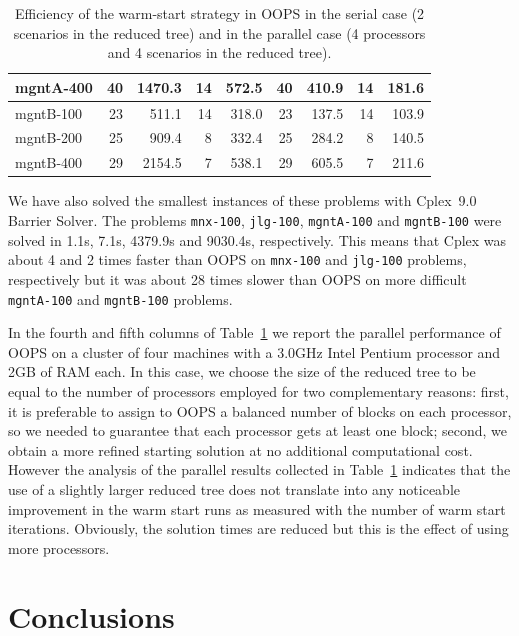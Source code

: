 \begin{table}[ht]
\begin{center}
\begin{tabular}{|l||rr|rr||rr|rr|}
mgntA-400     &   40 & 1470.3 &   14 &  572.5 &  40 &  410.9 &  14 &  181.6 \\
\hline
mgntB-100     &   23 &  511.1 &   14 &  318.0 &  23 &  137.5 &  14 &  103.9 \\
mgntB-200     &   25 &  909.4 &    8 &  332.4 &  25 &  284.2 &   8 &  140.5 \\
mgntB-400     &   29 & 2154.5 &    7 &  538.1 &  29 &  605.5 &   7 &  211.6 \\
\hline
    \end{tabular}
    \caption{Efficiency of the warm-start strategy in OOPS in the serial
             case (2 scenarios in the reduced tree) and in the parallel case
	     (4 processors and 4 scenarios in the reduced tree).}
    \label{table:oops}
  \end{center} \vspace{-3ex}
\end{table}


We have also solved the smallest instances of these problems 
with Cplex~9.0 Barrier Solver. The problems 
{\tt mnx-100}, {\tt jlg-100}, {\tt mgntA-100} and {\tt mgntB-100} 
were solved in 1.1s, 7.1s, 4379.9s and 9030.4s, respectively.
This means that Cplex was about 4 and 2 times faster than OOPS 
on {\tt mnx-100} and {\tt jlg-100} problems, respectively 
but it was about 28 times slower than OOPS on more difficult
{\tt mgntA-100} and {\tt mgntB-100} problems.

In the fourth and fifth columns of Table~\ref{table:oops} 
we report the parallel performance 
of OOPS on a cluster of four machines with a 3.0GHz Intel Pentium 
processor and 2GB of RAM each.
In this case, we choose the size of the reduced tree to be equal 
to the number of processors employed for two complementary reasons: 
first, it is preferable to assign to OOPS a balanced number of blocks 
on each processor, so we needed to guarantee that each processor 
gets at least one block; second, we obtain a more refined 
starting solution at no additional computational cost. 
However the analysis of the parallel results collected 
in Table~\ref{table:oops}
indicates that the use of a slightly larger reduced tree does not 
translate into any noticeable improvement in the warm start runs 
as measured with the number of warm start iterations.
Obviously, the solution times are reduced but this is the effect 
of using more processors.


%
%
\section{Conclusions}
\label{sec:Conclusions}

